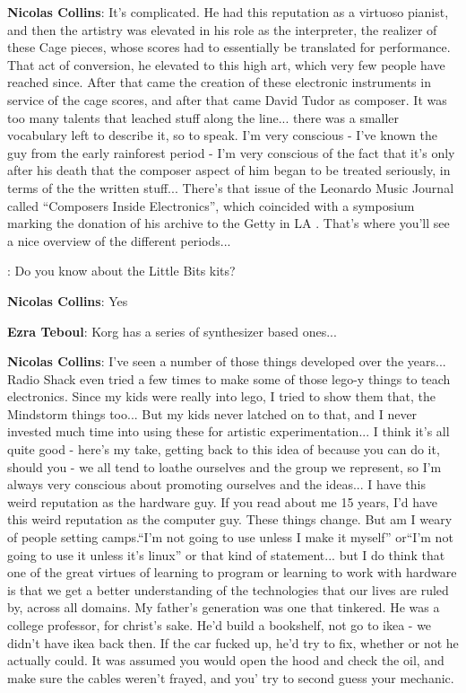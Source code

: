 \textbf{Nicolas Collins}: It’s complicated. He had this reputation as a virtuoso pianist, and then the artistry was elevated in his role as the interpreter, the realizer of these Cage pieces, whose scores had to essentially be translated for performance. That act of conversion, he elevated to this high art, which very few people have reached since. After that came the creation of these electronic instruments in service of the cage scores, and after that came David Tudor as composer. It was too many talents that leached stuff along the line... there was a smaller vocabulary left to describe it, so to speak. I’m very conscious - I’ve known the guy from the early rainforest period - I’m very conscious of the fact that it’s only after his death that the composer aspect of him began to be treated seriously, in terms of the the written stuff... There’s that issue of the Leonardo Music Journal called ``Composers Inside Electronics'', which coincided with a symposium marking the donation of his archive to the Getty in LA \citep{leonardo}. That’s where you’ll see a nice overview of the different periods...

: Do you know about the Little Bits kits?

\textbf{Nicolas Collins}: Yes 

\textbf{Ezra Teboul}: Korg has a series of synthesizer based ones...
					
\textbf{Nicolas Collins}: I’ve seen a number of those things developed over the years... Radio Shack even tried a few times to make some of those lego-y things to teach electronics. Since my kids were really into lego, I tried to show them that, the Mindstorm things too... But my kids never latched on to that, and I never invested much time into using these for artistic experimentation... I think it’s all quite good - here’s my take, getting back to this idea of because you can do it, should you - we all tend to loathe ourselves and the group we represent, so I’m always very conscious about promoting ourselves and the ideas... I have this weird reputation as the hardware guy. If you read about me 15 years, I’d have this weird reputation as the computer guy. These things change. But am I weary of people setting camps.``I’m not going to use unless I make it myself'' or``I’m not going to use it unless it’s linux'' or that kind of statement... but I do think that one of the great virtues of learning to program or learning to work with hardware is that we get a better understanding of the technologies that our lives are ruled by, across all domains. My father’s generation was one that tinkered. He was a college professor, for christ’s sake. He’d build a bookshelf, not go to ikea - we didn’t have ikea back then. If the car fucked up, he’d try to fix, whether or not he actually could. It was assumed you would open the hood and check the oil, and make sure the cables weren’t frayed, and you’ try to second guess your mechanic.
					

